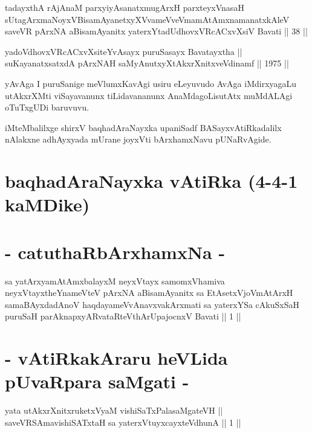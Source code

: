 \begin{shl}
tadayxthA rAjAnaM parxyiyAsanatxmugArxH parxteyxVnasaH sUtagArxmaNoyxV\s BisamAyanetxyXVvameVveVmamAtAmxnamanatxkAleV saveVR pArxNA aBisamAyanitx yaterxYtadUdhovxVRcACxvXsiV Bavati || 38 ||
\end{shl}

\begin{shl}
yadoVdhovxVRcACxvXsiteYvAsayx puruSasayx Bavatayxtha || \\
suKayanatxsatxdA pArxNAH saMyAnutxyXtAkxrXnitxveVdinamf \hfill || 1975 ||
  
\end{shl}

\begin{artha}
yAvAga I puruSanige meVlumxKavAgi usiru eLeyuvudo AvAga iMdirxyagaLu
utAkxrXMti viSayavanunx tiLidavananunx AnaMdagoLisutAtx muMdALAgi
oTuTxgUDi baruvuvu.
\end{artha}

\begin{center}
iMteMbalilxge shirxV baqhadAraNayxka upaniSadf BASayxvAtiRkadalilx
nAlakxne adhAyxyada mUrane joyxVti bArxhamxNavu  pUNaRvAgide.
\end{center}

\section*{baqhadAraNayxka vAtiRka (4-4-1 kaMDike)}

\section*{- catuthaRbArxhamxNa -}

\begin{shl}
sa yatArxyamAtAmxbalayxM neyxVtayx samomxVhamiva neyxVtayxtheYnameVteV pArxNA aBisamAyanitx sa EtAsetxVjoVmAtArxH samaBAyxdadAnoV haqdayameVvAnavxvakArxmati sa yaterxYSa cAkuSxSaH puruSaH parAknapxyARvataRteV\s thArUpajocnxV Bavati || 1 ||
\end{shl}

\section*{- vAtiRkakAraru heVLida pUvaRpara saMgati -}


\begin{shl}
yata utAkxrXnitxruketxVyaM vishiSaTxPalasaMgateVH || \\
saveVRSAmavishiSATx\s taH sa yaterxVtuyxcayxteV\s dhunA \hfill || 1 ||
  
\end{shl}

